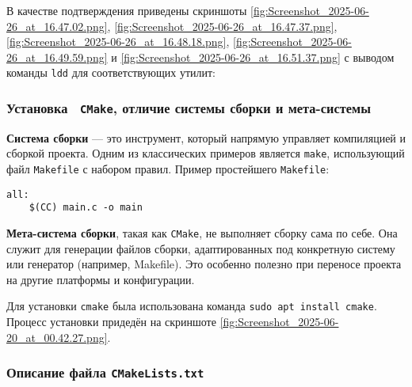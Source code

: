 В качестве подтверждения приведены скриншоты \ref{fig:Screenshot_2025-06-26_at_16.47.02.png}, \ref{fig:Screenshot_2025-06-26_at_16.47.37.png}, \ref{fig:Screenshot_2025-06-26_at_16.48.18.png}, \ref{fig:Screenshot_2025-06-26_at_16.49.59.png} и \ref{fig:Screenshot_2025-06-26_at_16.51.37.png} с выводом команды \texttt{ldd} для соответствующих утилит:






\subsubsection{Установка  \texttt{CMake}, отличие системы сборки и мета-системы}

\textbf{Система сборки} — это инструмент, который напрямую управляет компиляцией и сборкой проекта. Одним из классических примеров является \texttt{make}, использующий файл \texttt{Makefile} с набором правил. Пример простейшего \texttt{Makefile}:

\begin{verbatim}
all:
	$(CC) main.c -o main
\end{verbatim}

\textbf{Мета-система сборки}, такая как \texttt{CMake}, не выполняет сборку сама по себе. Она служит для генерации файлов сборки, адаптированных под конкретную систему или генератор (например, Makefile). Это особенно полезно при переносе проекта на другие платформы и конфигурации.

Для установки \texttt{cmake} была использована команда \texttt{sudo apt install cmake}. Процесс установки придедён на скриншоте \ref{fig:Screenshot_2025-06-20_at_00.42.27.png}.


\subsubsection*{Описание файла \texttt{CMakeLists.txt}}

